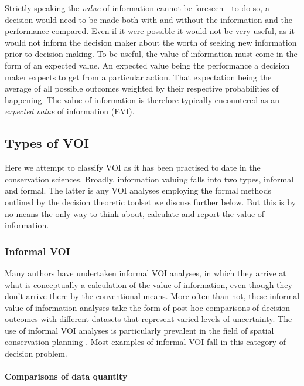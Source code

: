 \documentclass[]{article}
\theoremstyle{definition}
\theoremstyle{definition}
\theoremstyle{definition}
\theoremstyle{remark}
\begin{document}
Strictly speaking the \emph{value} of information cannot be
foreseen---to do so, a decision would need to be made both with and
without the information and the performance compared. Even if it were
possible it would not be very useful, as it would not inform the
decision maker about the worth of seeking new information prior to
decision making. To be useful, the value of information must come in the
form of an expected value. An expected value being the performance a
decision maker expects to get from a particular action. That expectation
being the average of all possible outcomes weighted by their respective
probabilities of happening. The value of information is therefore
typically encountered as an \emph{expected value} of information (EVI).

\subsection*{Types of VOI}\label{types-of-voi}

Here we attempt to classify VOI as it has been practised to date in the
conservation sciences. Broadly, information valuing falls into two
types, informal and formal. The latter is any VOI analyses employing the
formal methods outlined by the decision theoretic toolset we discuss
further below. But this is by no means the only way to think about,
calculate and report the value of information.

\subsubsection*{Informal VOI}\label{informal-voi}

Many authors have undertaken informal VOI analyses, in which they arrive
at what is conceptually a calculation of the value of information, even
though they don't arrive there by the conventional means. More often
than not, these informal value of information analyses take the form of
post-hoc comparisons of decision outcomes with different datasets that
represent varied levels of uncertainty. The use of informal VOI analyses
is particularly prevalent in the field of spatial conservation planning
\citep[e.g.,][]{Balmford1999}. Most examples of informal VOI fall in
this category of decision problem.

\paragraph*{Comparisons of data
quantity}\label{comparisons-of-data-quantity}
\end{document}
